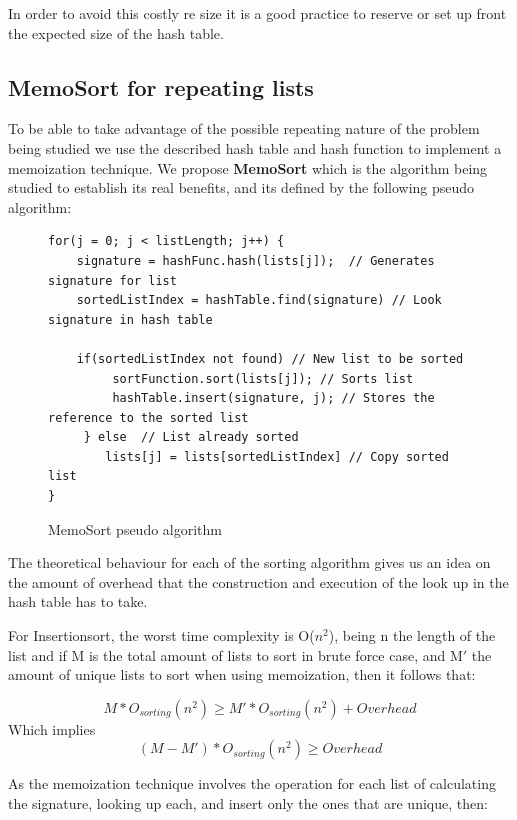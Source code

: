 \documentclass[a4paper,12pt]{article}
\begin{document}
In order to avoid this costly re size it is a good practice to  reserve or set up front the expected size of the hash table. 

\subsection{MemoSort for repeating lists}
To be able to take advantage of the possible repeating nature of the problem being studied we use the described hash table and hash function to implement a memoization technique. We propose \textbf{MemoSort} which is the algorithm being studied to establish its real benefits, and its defined by the following pseudo algorithm: 

\begin{figure}[H]
\begin{small}
\begin{verbatim}
for(j = 0; j < listLength; j++) {
    signature = hashFunc.hash(lists[j]);  // Generates signature for list
    sortedListIndex = hashTable.find(signature) // Look signature in hash table
    
    if(sortedListIndex not found) // New list to be sorted
         sortFunction.sort(lists[j]); // Sorts list
         hashTable.insert(signature, j); // Stores the reference to the sorted list
     } else  // List already sorted
        lists[j] = lists[sortedListIndex] // Copy sorted list
}
\end{verbatim}
\end{small}
\caption{MemoSort pseudo algorithm}
\end{figure}

The theoretical behaviour for each of the sorting algorithm gives us an idea on the amount of overhead that the construction and  execution of the look up in the hash table has to take. 

For Insertionsort, the worst time complexity is O($n^2$), being n the length of the list and if M is the total amount of lists to sort in brute force case, and M$'$ the amount of unique lists to sort when using memoization, then it follows that:

\begin{equation}
M * O_{sorting}(n^2)  \geq M' * O_{sorting}(n^2)  + Overhead
\end{equation}
Which implies
\begin{equation}
(M - M') *  O_{sorting}(n^2)  \geq Overhead
\end{equation}

As the memoization technique involves the operation for each list of calculating the signature, looking up each, and insert only the ones that are unique, then:
\end{document}
